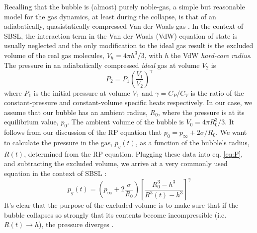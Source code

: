 \documentclass[11pt,prb,aps,nofootinbib,superscriptaddress,floatfix]{revtex4-2}
\begin{document}
Recalling that the bubble is (almost) purely noble-gas, a simple but reasonable model for the gas dynamics, at least during the collapse, is that of an adiabatically, quasistatically compressed Van der Waals gas \cite{brenner2002single,lofstedt1995sonoluminescing,barber1997defining,lofstedt1993toward,hilgenfeldt1999simple}. In the context of SBSL, the interaction term in the Van der Waals (VdW) equation of state is usually neglected and the only modification to the ideal gas result is the excluded volume of the real gas molecules, $V_h = 4 \pi h^3/3$, with $h$ the VdW \emph{hard-core radius}. The pressure in an adiabatically compressed \emph{ideal} gas at volume $V_2$ is \cite{schroeder1999introduction}
\begin{equation}
    P_2 = P_1 \left(\frac{V_1}{V_2}\right)^\gamma
\label{eq:P}
\end{equation}
where $P_1$ is the initial pressure at volume $V_1$ and $\gamma=C_P/C_V$ is the ratio of the constant-pressure and constant-volume specific heats respectively. In our case, we assume that our bubble has an ambient radius, $R_0$, where the pressure is at its equilibrium value, $p_0$. The ambient volume of the bubble is $V_0 =  4 \pi R_0^3/3$. It follows from our discussion of the RP equation that $p_0=p_\infty+2\sigma /R_0$. We want to calculate the pressure in the gas, $p_g(t)$, as a function of the bubble's radius, $R(t)$, determined from the RP equation. Plugging these data into eq. \ref{eq:P}, and subtracting the excluded volume, we arrive at a very commonly used equation in the context of SBSL \cite{brenner2002single,lofstedt1995sonoluminescing,barber1997defining,lofstedt1993toward,hilgenfeldt1999simple,sivasubramanian2002temperature}:
\begin{equation}
    p_g(t) = \left( p_\infty+2\frac{\sigma}{R_0} \right) \left[ \frac{R_0^3-h^3}{R^3(t)-h^3} \right] ^ \gamma
    \label{eq:p_g}
\end{equation}
It's clear that the purpose of the excluded volume is to make sure that if the bubble collapses so strongly that its contents become incompressible (i.e. $R(t)\rightarrow h$), the pressure diverges \cite{lofstedt1993toward,brenner2002single}.
\end{document}
